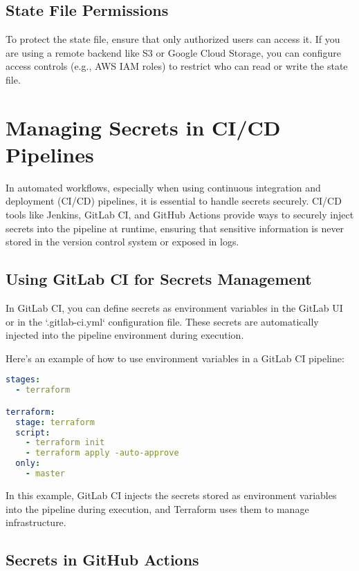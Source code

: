 \subsection{State File Permissions}

To protect the state file, ensure that only authorized users can access it. If you are using a remote backend like S3 or Google Cloud Storage, you can configure access controls (e.g., AWS IAM roles) to restrict who can read or write the state file.

\section{Managing Secrets in CI/CD Pipelines}

In automated workflows, especially when using continuous integration and deployment (CI/CD) pipelines, it is essential to handle secrets securely. CI/CD tools like Jenkins, GitLab CI, and GitHub Actions provide ways to securely inject secrets into the pipeline at runtime, ensuring that sensitive information is never stored in the version control system or exposed in logs.

\subsection{Using GitLab CI for Secrets Management}

In GitLab CI, you can define secrets as environment variables in the GitLab UI or in the `.gitlab-ci.yml` configuration file. These secrets are automatically injected into the pipeline environment during execution.

Here's an example of how to use environment variables in a GitLab CI pipeline:

\begin{lstlisting}[language=yaml]
stages:
  - terraform

terraform:
  stage: terraform
  script:
    - terraform init
    - terraform apply -auto-approve
  only:
    - master
\end{lstlisting}

In this example, GitLab CI injects the secrets stored as environment variables into the pipeline during execution, and Terraform uses them to manage infrastructure.

\subsection{Secrets in GitHub Actions}

